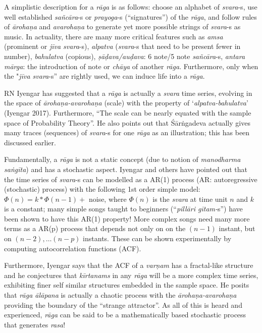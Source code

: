 A simplistic description for a \textsl{rāga} is as follows: choose an alphabet of \textsl{svara}-s, use well established \textsl{sañcāra}-s or \textsl{prayoga}-s (“signatures”) of the \textsl{rāga}, and follow rules of \textsl{ārohaṇa} and \textsl{avarohaṇa} to generate yet more possible strings of \textsl{svara}-s as music. In actuality, there are many more critical features such as \textsl{amsa} (prominent or \textsl{jīva svara}-s), \textsl{alpatva} (\textsl{svara}-s that need to be present fewer in number), \textsl{bahulatva} (copious), \textsl{ṣāḍava/auḍava}: 6 note/5 note \textsl{sañcāra}-s, \textsl{antara mārga}: the introduction of note or \textsl{chāya} of another \textsl{rāga}. Furthermore, only when the "\textsl{jīva svara}-s” are rightly used, we can induce life into a \textsl{rāga}.

RN Iyengar has suggested that a \textsl{rāga} is actually a \textsl{svara} time series, evolving in the space of \textsl{ārohaṇa-avarohaṇa} (scale) with the property of ‘\textsl{alpatva-bahulatva}’ (Iyengar 2017). Furthermore, “The scale can be nearly equated with the sample space of Probability Theory”. He also points out that Śārṅgadeva actually gives many traces (sequences) of \textsl{svara}-s for one \textsl{rāga} as an illustration; this has been discussed earlier.

Fundamentally, a \textsl{rāga} is not a static concept (due to notion of \textsl{manodharma saṅgīta}) and has a stochastic aspect. Iyengar and others have pointed out that the time series of \textsl{svara}-s can be modelled as a AR(1) process (AR: autoregressive (stochastic) process) with the following 1st order simple model: $\Phi(n) = k*\Phi(n-1)+$ noise, where $\Phi(n)$ is the \textsl{svara} at time unit $n$ and $k$ is a constant; many simple songs taught to beginners (“\textsl{pillāri gītam-}s”) have been shown to have this AR(1) property! More complex songs need many more terms as a AR(p) process that depends not only on on the $(n-1)$ instant, but on $(n-2),\ldots (n-p)$ instants. These can be shown experimentally by computing autocorrelation functions (ACF).

Furthermore, Iyengar says that the ACF of a \textsl{varṇam} has a fractal-like structure and he conjectures that \textsl{kīrtanams} in any \textsl{rāga} will be a more complex time series, exhibiting finer self similar structures embedded in the sample space. He posits that \textsl{rāga ālāpana} is actually a chaotic process with the \textsl{ārohaṇa-avarohaṇa} providing the boundary of the “strange attractor”. As all of this is heard and experienced, \textsl{rāga} can be said to be a mathematically based stochastic process that generates \textsl{rasa}!

